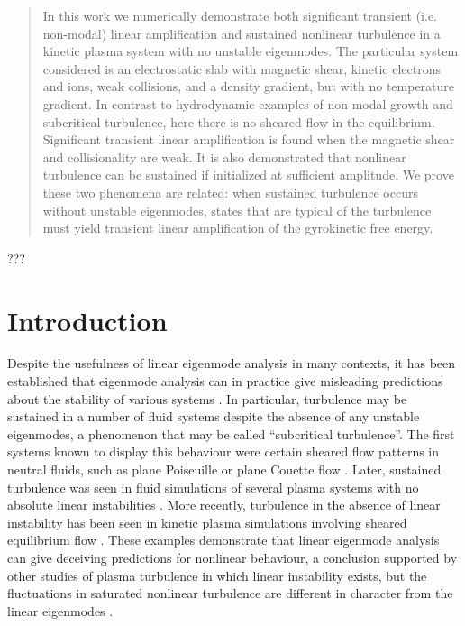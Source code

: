 \documentclass{jpp}
\begin{document}
\begin{abstract}

In this work we numerically demonstrate both significant transient (i.e. non-modal) linear amplification
and sustained nonlinear turbulence
in a kinetic plasma system with no unstable eigenmodes.
The particular system considered is an electrostatic slab
with magnetic shear, kinetic electrons and ions,
weak collisions,
and a density gradient, but with no temperature gradient.
In contrast to hydrodynamic examples of non-modal growth and subcritical turbulence,
here there is no sheared flow in the equilibrium.
Significant transient linear amplification
is found when the magnetic shear and collisionality are weak.
It is also demonstrated that nonlinear turbulence can be sustained if initialized
at sufficient amplitude.
We prove these two phenomena are related:
when sustained turbulence occurs without unstable eigenmodes,
states that are typical of the turbulence must
yield transient linear amplification of the gyrokinetic free energy.

\end{abstract}

\begin{PACS}
???
\end{PACS}


\section{Introduction}

Despite the usefulness of linear eigenmode analysis in many contexts,
it has been established that
eigenmode analysis can in practice give misleading predictions
about the stability of various systems \citep{TrefethenEmbree}.
In particular, turbulence may be sustained in a number of fluid systems
despite the absence of any unstable eigenmodes,
a phenomenon that may be called ``subcritical turbulence''.
The first systems known to display this behaviour were certain sheared flow patterns in
neutral fluids, such as plane Poiseuille or plane Couette flow
\citep{Tillmark,TrefethenSubcritical,Grossman}.
Later, sustained turbulence was seen
in fluid simulations of several plasma systems with no absolute linear instabilities
\citep{Waltz, Scott1, Scott2, Drake}.
More recently,
turbulence in the absence of linear instability has been seen in kinetic plasma simulations involving
sheared equilibrium flow \citep{EdmundPRL, BarnesRotation}.
These examples demonstrate that linear eigenmode analysis can give
deceiving predictions for nonlinear behaviour,
a conclusion supported by other studies of plasma turbulence in which
linear instability exists, but
the fluctuations in saturated nonlinear turbulence are different in character from the linear
eigenmodes \citep{Biskamp,Friedman1,Friedman2}.
\end{document}
